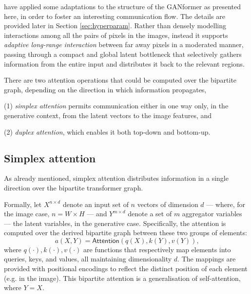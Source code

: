 \documentclass{article}
\begin{document}
\citet{hudson2021generative} have applied some adaptations to the structure of the GANformer as 
presented here, in order to foster an interesting communication flow. The details are provided later 
in Section \ref{sec:hyperparam}.
Rather than densely modelling interactions among all the pairs of pixels in the images, instead it 
supports \textit{adaptive long-range interaction} between far away pixels in a moderated manner, 
passing through a compact and global latent bottleneck that selectively gathers information from 
the entire input and distributes it back to the relevant regions. 

There are two attention operations that could be computed over the bipartite graph, depending 
on the direction in which information propagates, 
\begin{enumerate*}
	\item [(1)] \textit{simplex attention} permits communication either in one way only, in the 
	generative context, from the latent vectors to the image features, and
	\item [(2)] \textit{duplex attention}, which enables it both top-down and bottom-up.
\end{enumerate*}

\subsection{Simplex attention}
As already mentioned, simplex attention distributes information in a single direction over the 
bipartite transformer graph. 

Formally, let $X^{n\times d}$ denote an input set of $n$ vectors of dimension $d$ — where, for the 
image case, $n = W\times H$ — and $Y^{m\times d}$ denote a set of $m$ aggregator variables — 
the latent variables, in the generative case. Specifically, the attention is computed over the derived 
bipartite graph between these two groups of elements:
\begin{equation}
	\label{eqn:attention2}
	a(X,Y)=\mathsf{Attention}(q(X), k(Y), v(Y)) \mbox{,}
\end{equation}
where $q(\cdot), k(\cdot), v(\cdot)$ are functions that respectively map elements into queries, 
keys, and values, all maintaining dimensionality $d$. 
The mappings are provided with positional encodings to reflect the distinct position of each element 
(e.g. in the image). This bipartite attention is a generalisation of self-attention, where $Y = X$.
\end{document}
